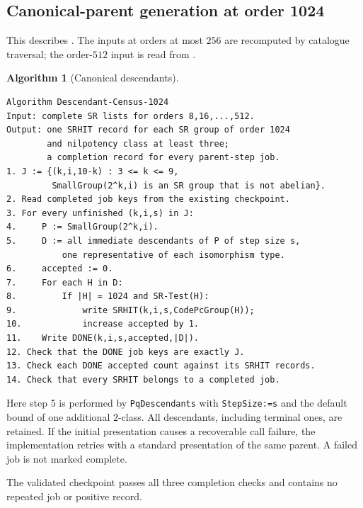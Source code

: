 \documentclass[11pt,a4paper]{amsart}
\theoremstyle{definition}
\newtheorem{algorithm}{Algorithm}
\theoremstyle{remark}
\numberwithin{equation}{section}
\begin{document}
\subsection{Canonical-parent generation at order 1024}
This describes . The inputs at orders at most
$256$ are recomputed by catalogue traversal; the order-$512$
input is read from .
\par\noindent\begin{minipage}{\linewidth}
\begin{algorithm}[Canonical descendants]\label{alg:descendants}
\leavevmode\par
\begin{lstlisting}
Algorithm Descendant-Census-1024
Input: complete SR lists for orders 8,16,...,512.
Output: one SRHIT record for each SR group of order 1024
        and nilpotency class at least three;
        a completion record for every parent-step job.
1. J := {(k,i,10-k) : 3 <= k <= 9,
         SmallGroup(2^k,i) is an SR group that is not abelian}.
2. Read completed job keys from the existing checkpoint.
3. For every unfinished (k,i,s) in J:
4.     P := SmallGroup(2^k,i).
5.     D := all immediate descendants of P of step size s,
           one representative of each isomorphism type.
6.     accepted := 0.
7.     For each H in D:
8.         If |H| = 1024 and SR-Test(H):
9.             write SRHIT(k,i,s,CodePcGroup(H));
10.            increase accepted by 1.
11.    Write DONE(k,i,s,accepted,|D|).
12. Check that the DONE job keys are exactly J.
13. Check each DONE accepted count against its SRHIT records.
14. Check that every SRHIT belongs to a completed job.
\end{lstlisting}
\end{algorithm}
\end{minipage}\par\medskip
Here step 5 is performed by \texttt{PqDescendants} with
\texttt{StepSize:=s} and the default bound of one additional
$2$-class. All descendants, including terminal ones, are retained.
If the initial presentation causes a recoverable call failure,
the implementation retries with a standard presentation of the
same parent. A failed job is not marked complete.

The validated checkpoint passes all three completion checks and contains no repeated job or positive record.
\end{document}
